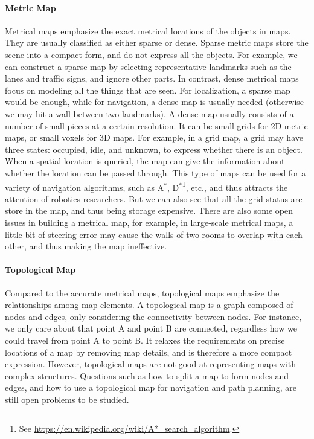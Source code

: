 \paragraph{Metric Map}
Metrical maps emphasize the exact metrical locations of the objects in maps. They are usually classified as either sparse or dense. Sparse metric maps store the scene into a compact form, and do not express all the objects. For example, we can construct a sparse map by selecting representative landmarks such as the lanes and traffic signs, and ignore other parts. In contrast, dense metrical maps focus on modeling all the things that are seen. For localization, a sparse map would be enough, while for navigation, a dense map is usually needed (otherwise we may hit a wall between two landmarks). A dense map usually consists of a number of small pieces at a certain resolution. It can be small grids for 2D metric maps, or small voxels for 3D maps. For example, in a grid map, a grid may have three states: occupied, idle, and unknown, to express whether there is an object. When a spatial location is queried, the map can give the information about whether the location can be passed through. This type of maps can be used for a variety of navigation algorithms, such as A$^*$, D$^*$\footnote{ See \url{https://en.wikipedia.org/wiki/A*_search_algorithm}.}, etc., and thus attracts the attention of robotics researchers. But we can also see that all the grid status are store in the map, and thus being storage expensive. There are also some open issues in building a metrical map, for example, in large-scale metrical maps, a little bit of steering error may cause the walls of two rooms to overlap with each other, and thus making the map ineffective.

\paragraph{Topological Map}
Compared to the accurate metrical maps, topological maps emphasize the relationships among map elements. A topological map is a graph composed of nodes and edges, only considering the connectivity between nodes. For instance, we only care about that point A and point B are connected, regardless how we could travel from point A to point B. It relaxes the requirements on precise locations of a map by removing map details, and is therefore a more compact expression. However, topological maps are not good at representing maps with complex structures. Questions such as how to split a map to form nodes and edges, and how to use a topological map for navigation and path planning, are still open problems to be studied.

